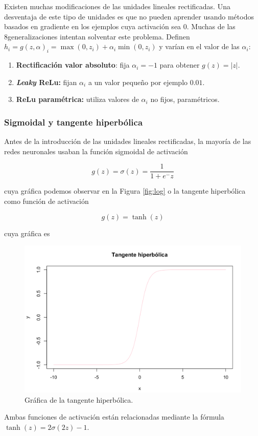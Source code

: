 	 Existen muchas modificaciones de las unidades lineales rectificadas. Una desventaja de este tipo de unidades es que no pueden aprender usando métodos basados en gradiente en los ejemplos cuya activación sea 0. Muchas de las 8generalizaciones intentan solventar este problema. Definen $h_i = g(z, \alpha)_i = \max(0, z_i) + \alpha_i \min(0, z_i)$ y varían en el valor de las $\alpha_i$:
	 
	 \begin{enumerate}
		 \item \textbf{Rectificación valor absoluto}: fija $\alpha_i = -1$ para obtener $g(z) = |z|$.
		 \item \textbf{\textit{Leaky} ReLu: } fijan $\alpha_i$ a un valor pequeño por ejemplo $0.01$.
		 \item \textbf{ReLu paramétrica: } utiliza valores de $\alpha_i$ no fijos, paramétricos.
	 
	\end{enumerate}
	 
	 
	 \subsubsection{Sigmoidal y tangente hiperbólica}
	
	Antes de la introducción de las unidades lineales rectificadas, la mayoría de las redes neuronales usaban la función sigmoidal de activación 
	
	$$
		g(z) = \sigma(z) = \frac{1}{1 + e^-z}
	$$
	
	cuya gráfica podemos observar en la Figura \ref{fig:log} o la tangente hiperbólica como función de activación
	
	$$
		g(z) = \tanh(z)
	$$
	
	cuya gráfica es 
	
	\begin{figure}[h!]
		\centering
		\includegraphics[width=0.8\linewidth]{imagenes/tanh}
		\caption{Gráfica de la tangente hiperbólica.}
		\label{fig:tanh}
	\end{figure}
	
	Ambas funciones de activación están relacionadas mediante la fórmula $\tanh(z) = 2 \sigma(2z) - 1$.
	
	
